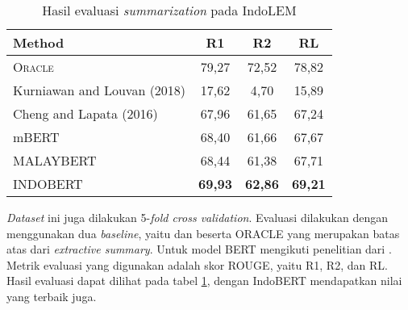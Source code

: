 \begin{table}[h]
    \vspace{0.25cm}
    \centering
    \caption{Hasil evaluasi \textit{summarization} pada IndoLEM}
    \label{table:indolem-summarization-result}
    \begin{tabular}{lccc}
        \toprule
        \textbf{Method} & \textbf{R1} & \textbf{R2} & \textbf{RL} \\
        \midrule
        \textsc{Oracle} & 79,27 & 72,52 & 78,82 \\
        Kurniawan and Louvan (2018) & 17,62 & 4,70 & 15,89 \\
        Cheng and Lapata (2016) & 67,96 & 61,65 & 67,24 \\
        mBERT & 68,40 & 61,66 & 67,67 \\
        MALAYBERT & 68,44 & 61,38 & 67,71 \\
        INDOBERT & \textbf{69,93} & \textbf{62,86} & \textbf{69,21} \\
        \bottomrule
    \end{tabular}
\end{table}

\textit{Dataset} ini juga dilakukan 5-\textit{fold cross validation}. Evaluasi dilakukan dengan menggunakan dua \textit{baseline}, yaitu \citeauthor{summarization} dan \citeauthor{summarization_lstm} beserta ORACLE yang merupakan batas atas dari \textit{extractive summary}. Untuk model BERT mengikuti penelitian dari \citeauthor{summarization_bert} \parencite{indolem}. Metrik evaluasi yang digunakan adalah skor ROUGE, yaitu R1, R2, dan RL. Hasil evaluasi dapat dilihat pada tabel \ref{table:indolem-summarization-result}, dengan IndoBERT mendapatkan nilai yang terbaik juga.
